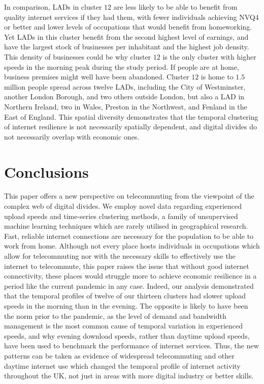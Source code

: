 \documentclass[Royal,times,sageh]{sagej}
\begin{document}
In comparison, LADs in cluster \(12\) are less likely to be able to
benefit from quality internet services if they had them, with fewer
individuals achieving NVQ4 or better and lower levels of occupations
that would benefit from homeworking. Yet LADs in this cluster benefit
from the second highest level of earnings, and have the largest stock of
businesses per inhabitant and the highest job density. This density of
businesses could be why cluster \(12\) is the only cluster with higher
speeds in the morning peak during the study period. If people are at
home, business premises might well have been abandoned. Cluster \(12\)
is home to \(1.5\) million people spread across twelve LADs, including
the City of Westminster, another London Borough, and two others outside
London, but also a LAD in Northern Ireland, two in Wales, Preston in the
Northwest, and Fenland in the East of England. This spatial diversity
demonstrates that the temporal clustering of internet resilience is not
necessarily spatially dependent, and digital divides do not necessarily
overlap with economic ones.

\hypertarget{sec:5}{%
\section{Conclusions}\label{sec:5}}

This paper offers a new perspective on telecommuting from the viewpoint
of the complex web of digital divides. We employ novel data regarding
experienced upload speeds and time-series clustering methods, a family
of unsupervised machine learning techniques which are rarely utilised in
geographical research. Fast, reliable internet connections are necessary
for the population to be able to work from home. Although not every
place hosts individuals in occupations which allow for telecommuting nor
with the necessary skills to effectively use the internet to
telecommute, this paper raises the issue that without good internet
connectivity, these places would struggle more to achieve economic
resilience in a period like the current pandemic in any case. Indeed,
our analysis demonstrated that the temporal profiles of twelve of our
thirteen clusters had slower upload speeds in the morning than in the
evening. The opposite is likely to have been the norm prior to the
pandemic, as the level of demand and bandwidth management is the most
common cause of temporal variation in experienced speeds, and why
evening download speeds, rather than daytime upload speeds, have been
used to benchmark the performance of internet services. Thus, the new
patterns can be taken as evidence of widespread telecommuting and other
daytime internet use which changed the temporal profile of internet
activity throughout the UK, not just in areas with more digital industry
or better skills.
\end{document}
